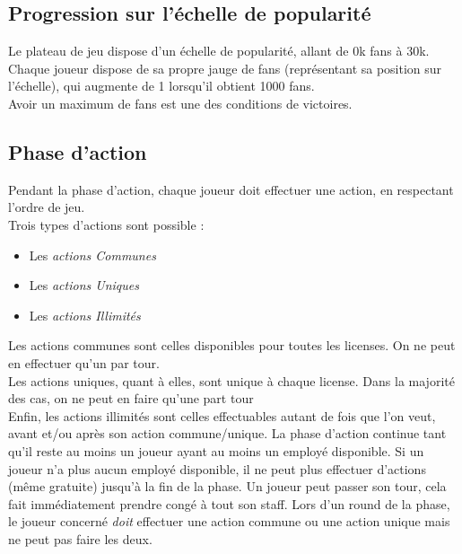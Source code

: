         \subsection{Progression sur l'échelle de popularité}

            Le plateau de jeu dispose d'un échelle de popularité, allant de 0k fans à 30k.
            Chaque joueur dispose de sa propre jauge de fans (représentant sa position sur l'échelle),
            qui augmente de 1 lorsqu'il obtient 1000 fans.
            \\
            Avoir un maximum de fans est une des conditions de victoires.



        \subsection{Phase d'action}

            Pendant la phase d'action, chaque joueur doit effectuer une action, en respectant l'ordre de jeu.
            \\
            Trois types d'actions sont possible :
            \begin{itemize}
                \item Les \textit{actions Communes}
                \item Les \textit{actions Uniques}
                \item Les \textit{actions Illimités}
            \end{itemize}

            Les actions communes sont celles disponibles pour toutes les licenses.
            On ne peut en effectuer qu'un par tour.
            \\
            Les actions uniques, quant à elles, sont unique à chaque license.
            Dans la majorité des cas, on ne peut en faire qu'une part tour
            \\
            Enfin, les actions illimités sont celles effectuables autant de fois que
            l'on veut, avant et/ou après son action commune/unique.
            \newline
            La phase d'action continue tant qu'il reste au moins un joueur ayant au moins un employé disponible.
            Si un joueur n'a plus aucun employé disponible, il ne peut plus effectuer d'actions (même gratuite)
            jusqu'à la fin de la phase.
            Un joueur peut passer son tour, cela fait immédiatement prendre congé à tout son staff.
            \newline
            Lors d'un round de la phase, le joueur concerné \emph{doit} effectuer une action commune
            ou une action unique mais ne peut pas faire les deux.

